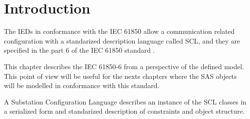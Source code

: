 \section{Introduction}

The IEDs in conformance with the 
IEC 61850 allow a communication related 
configuration with 
a standarized description language 
called SCL, and they are specified 
in the part 6 of 
the IEC 61850 standard \cite{IEC61850-6:2004}.

This chapter describes the IEC 61850-6 \cite{IEC61850-6:2004} 
from a perspective of the defined model. This 
point of view will be useful for the 
nexts chapters where the SAS objects will be 
modelled in conformance with this standard.   

A Substation Configuration Language describes 
an instance of the SCL classes in a serialized form 
and standarized description of constraints and object structure. 





